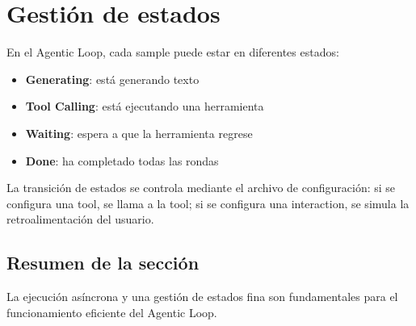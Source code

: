 \section{Gestión de estados}
En el Agentic Loop, cada sample puede estar en diferentes estados:
\begin{itemize}
  \item \textbf{Generating}: está generando texto
  \item \textbf{Tool Calling}: está ejecutando una herramienta
  \item \textbf{Waiting}: espera a que la herramienta regrese
  \item \textbf{Done}: ha completado todas las rondas
\end{itemize}

La transición de estados se controla mediante el archivo de configuración: si se configura una tool, se llama a la tool; si se configura una interaction, se simula la retroalimentación del usuario.

\subsection{Resumen de la sección}
La ejecución asíncrona y una gestión de estados fina son fundamentales para el funcionamiento eficiente del Agentic Loop.

\newpage

